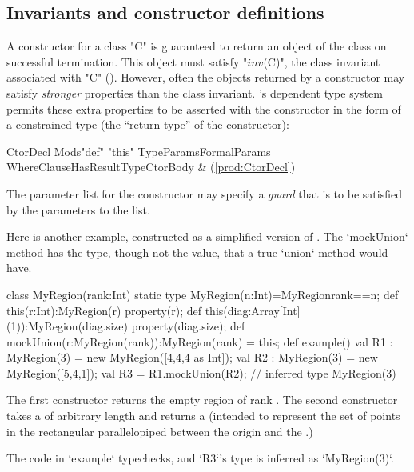 \subsection{Invariants and constructor definitions}

A constructor for a class \xcd"C" is guaranteed to return an object of the
class on successful termination. This object must satisfy  \xcdmath"$\mathit{inv}$(C)", the
class invariant associated with \xcd"C" ().
However,
often the objects returned by a constructor may satisfy {\em stronger}
properties than the class invariant. \Xten{}'s dependent type system
permits these extra properties to be asserted with the constructor in
the form of a constrained type (the ``return type'' of the constructor):

\begin{bbgrammar}
            CtorDecl \: Mods\opt \xcd"def" \xcd"this" TypeParams\opt FormalParams WhereClause\opt HasResultType\opt  CtorBody & (\ref{prod:CtorDecl}) \\
\end{bbgrammar}

\label{ConstructorGuard}

The parameter list for the constructor
may specify a \emph{guard} that is to be satisfied by the parameters
to the list.

\begin{ex}
Here is another example, constructed as a simplified 
version of .  The \xcd`mockUnion` method 
has the type, though not the value, that a true \xcd`union` method would have.

\begin{xten}
class MyRegion(rank:Int) {
  static type MyRegion(n:Int)=MyRegion{rank==n};
  def this(r:Int):MyRegion(r) {
    property(r);
  }
  def this(diag:Array[Int](1)):MyRegion(diag.size){ 
    property(diag.size);
  }
  def mockUnion(r:MyRegion(rank)):MyRegion(rank) = this;
  def example() {
    val R1 : MyRegion(3) = new MyRegion([4,4,4 as Int]); 
    val R2 : MyRegion(3) = new MyRegion([5,4,1]); 
    val R3 = R1.mockUnion(R2); // inferred type MyRegion(3)
  }
}
\end{xten}
%
The first constructor returns the empty region of rank .  The
second constructor takes a  of arbitrary length
 and returns a  (intended to represent the set
of points in the rectangular parallelopiped between the origin and the
.)

The code in \xcd`example` typechecks, and \xcd`R3`'s type is inferred as
\xcd`MyRegion(3)`.  


\end{ex}

